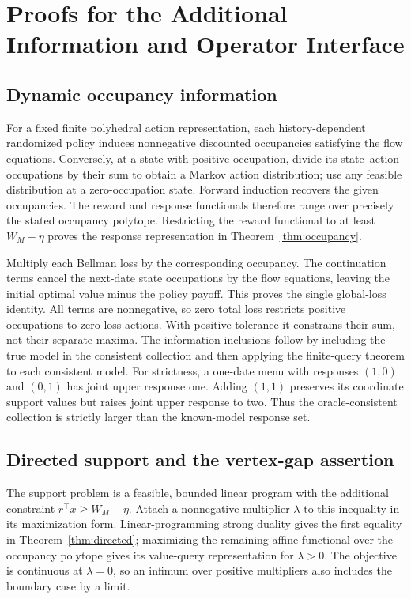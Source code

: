 \section{Proofs for the Additional Information and Operator Interface}
\label{sec:r19-interface-proofs}
\subsection{Dynamic occupancy information}
For a fixed finite polyhedral action representation, each history-dependent randomized policy induces nonnegative discounted occupancies satisfying the flow equations. Conversely, at a state with positive occupation, divide its state--action occupations by their sum to obtain a Markov action distribution; use any feasible distribution at a zero-occupation state. Forward induction recovers the given occupancies. The reward and response functionals therefore range over precisely the stated occupancy polytope. Restricting the reward functional to at least $W_M-\eta$ proves the response representation in Theorem~\ref{thm:occupancy}.

Multiply each Bellman loss by the corresponding occupancy. The continuation terms cancel the next-date state occupations by the flow equations, leaving the initial optimal value minus the policy payoff. This proves the single global-loss identity. All terms are nonnegative, so zero total loss restricts positive occupations to zero-loss actions. With positive tolerance it constrains their sum, not their separate maxima. The information inclusions follow by including the true model in the consistent collection and then applying the finite-query theorem to each consistent model. For strictness, a one-date menu with responses $(1,0)$ and $(0,1)$ has joint upper response one. Adding $(1,1)$ preserves its coordinate support values but raises joint upper response to two. Thus the oracle-consistent collection is strictly larger than the known-model response set.

\subsection{Directed support and the vertex-gap assertion}
The support problem is a feasible, bounded linear program with the additional constraint $r^\top x\geq W_M-\eta$. Attach a nonnegative multiplier $\lambda$ to this inequality in its maximization form. Linear-programming strong duality gives the first equality in Theorem~\ref{thm:directed}; maximizing the remaining affine functional over the occupancy polytope gives its value-query representation for $\lambda>0$. The objective is continuous at $\lambda=0$, so an infimum over positive multipliers also includes the boundary case by a limit.


